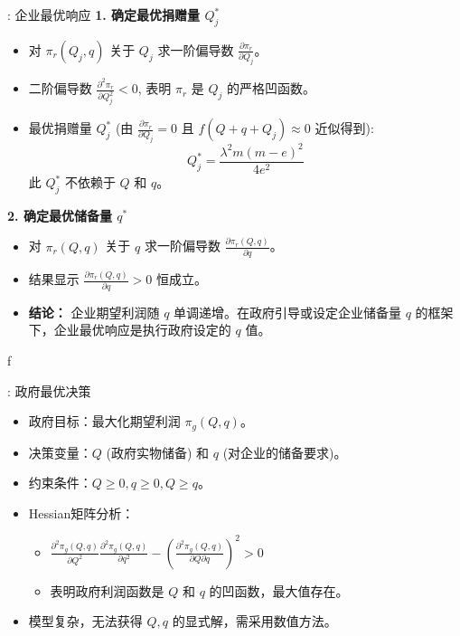 \documentclass[9pt]{beamer}
\begin{document}
\begin{frame}{\insertsectionhead: 企业最优响应}
    \textbf{1. 确定最优捐赠量 $Q_j^*$}
    \begin{itemize}
        \item 对 $\pi_r(Q_j,q)$ 关于 $Q_j$ 求一阶偏导数 $\frac{\partial{\pi}_r}{\partial Q_j}$。
        \item 二阶偏导数 $\frac{\partial^2 {\pi}_r}{\partial Q_j^2} < 0$, 表明 $\pi_r$ 是 $Q_j$ 的严格凹函数。
        \item 最优捐赠量 $Q_j^*$ (由 $\frac{\partial{\pi}_r}{\partial Q_j}=0$ 且 $f(Q+q+Q_j) \approx 0$ 近似得到):
        \begin{equation} \label{eq:beamer_optimal_Qj}
        Q_j^* = \frac{\lambda^2 m (m-e)^2}{4e^2}
        \end{equation}
        此 $Q_j^*$ 不依赖于 $Q$ 和 $q$。
    \end{itemize}
    \vspace{0.5em}
    \textbf{2. 确定最优储备量 $q^*$}
    \begin{itemize}
        \item 对 $\pi_r(Q,q)$ 关于 $q$ 求一阶偏导数 $\frac{\partial \pi_r(Q,q)}{\partial q}$。
        \item 结果显示 $\frac{\partial \pi_r(Q,q)}{\partial q} > 0$ 恒成立。
        \item \textbf{结论：} 企业期望利润随 $q$ 单调递增。在政府引导或设定企业储备量 $q$ 的框架下，企业最优响应是执行政府设定的 $q$ 值。
    \end{itemize}
f\end{frame}

\begin{frame}{\insertsectionhead: 政府最优决策}
    \begin{itemize}
        \item 政府目标：最大化期望利润 $\pi_g(Q,q)$。
        \item 决策变量：$Q$ (政府实物储备) 和 $q$ (对企业的储备要求)。
        \item 约束条件：$Q \ge 0, q \ge 0, Q \ge q$。
        \item Hessian矩阵分析：
            \begin{itemize}
                \item $\frac{\partial^2 \pi_g(Q,q)}{\partial Q^2} \frac{\partial^2 \pi_g(Q,q)}{\partial q^2} - \left(\frac{\partial^2 \pi_g(Q,q)}{\partial Q\partial q}\right)^2 > 0$
                \item 表明政府利润函数是 $Q$ 和 $q$ 的凹函数，最大值存在。
            \end{itemize}
        \item 模型复杂，无法获得 $Q, q$ 的显式解，需采用数值方法。
    \end{itemize}
\end{frame}
\end{document}
